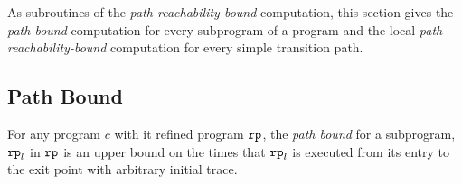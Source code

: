 
As subroutines of the \emph{path reachability-bound} computation, this section gives the \emph{path bound} computation for every subprogram of a program and the local \emph{path reachability-bound} computation for every simple transition path.
\subsection{Path Bound}
\begin{defn}
 For any program $c$ with it refined program $\mathtt{rp}$,
 the \emph{path bound}
 for a subprogram, $\mathtt{rp}_l$ in $\mathtt{rp}$ is an upper bound on the times that $\mathtt{rp}_l$ is executed from its entry to the exit point with arbitrary initial trace.
\end{defn}

